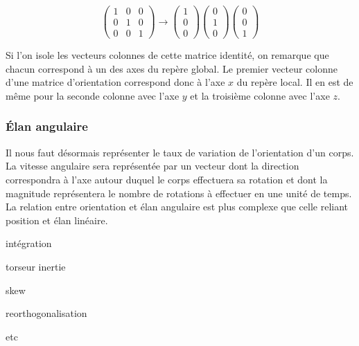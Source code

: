 \[
\begin{pmatrix}
  1 & 0 & 0 \\
  0 & 1 & 0 \\
  0 & 0 & 1
\end{pmatrix}
\rightarrow
\begin{pmatrix}
  1 \\
  0 \\
  0 
\end{pmatrix}
\begin{pmatrix}
  0 \\
  1 \\
  0 
\end{pmatrix}
\begin{pmatrix}
  0 \\
  0 \\
  1 
\end{pmatrix}
\]

Si l'on isole les vecteurs colonnes de cette matrice identité, on remarque que chacun correspond à un des axes du repère global. Le premier vecteur colonne d'une matrice d'orientation correspond donc à l'axe $x$ du repère local. Il en est de même pour la seconde colonne avec l'axe $y$ et la troisième colonne avec l'axe $z$.

\subsubsection{\'Elan angulaire}

Il nous faut désormais représenter le taux de variation de l'orientation d'un corps. La vitesse angulaire sera représentée par un vecteur dont la direction correspondra à l'axe autour duquel le corps effectuera sa rotation et dont la magnitude représentera le nombre de rotations à effectuer en une unité de temps. La relation entre orientation et élan angulaire est plus complexe que celle reliant position et élan linéaire.

intégration

torseur inertie

skew

reorthogonalisation

etc
